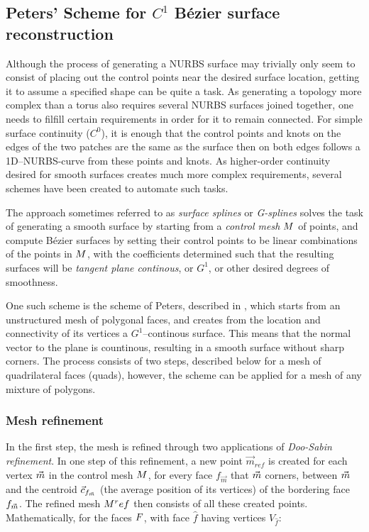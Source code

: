 \subsection{Peters' Scheme for $C^1$ B{\'e}zier surface reconstruction}
Although the process of generating a NURBS surface may trivially only seem to consist of placing out the control points near the desired surface location, getting it to assume a specified shape can be quite a task. As generating a topology more complex than a torus  also requires several NURBS surfaces joined together, one needs to filfill certain requirements in order for it to remain connected. For simple surface continuity ($C^0$), it is enough that the control points and knots on the edges of the two patches are the same as the surface then on both edges follows a 1D--NURBS-curve from these points and knots. As higher-order continuity desired for smooth surfaces creates much more complex requirements, several schemes have been created to automate such tasks.

The approach sometimes referred to as \emph{surface splines} or \emph{G-splines} \cite{eck1996automatic} solves the task of generating a smooth surface by starting from a \emph{control mesh} $\petersControlMesh$ of points, and compute B{\'e}zier surfaces by setting their control points to be linear combinations of the points in $\petersControlMesh$, with the coefficients determined such that the resulting surfaces will be \emph{tangent plane continous}, or $G^1$, or other desired degrees of smoothness. 

One such scheme is the scheme of Peters, described in \cite{peters1992constructing}, which starts from an unstructured mesh of polygonal faces, and creates from the location and connectivity of its vertices a $G^1$--continous surface. This means that the normal vector to the plane is countinous, resulting in a smooth surface without sharp corners. The process consists of two steps, described below for a mesh of quadrilateral faces (quads), however, the scheme can be applied for a mesh of any mixture of polygons.

\subsubsection{Mesh refinement}
In the first step, the mesh is refined through two applications of \emph{Doo-Sabin refinement}. In one step of this refinement, a new point $\vec{m}_{ref}$  is created for each vertex $\petersControlMeshVec$ in the control mesh $\petersControlMesh$, for every face $f_{\vec{m}}$ that $\petersControlMeshVec$ corners,  between $\petersControlMeshVec$ and the centroid $\centroidof{f_{\petersControlMeshVec}}$ (the average position of its vertices) of the bordering face $f_{\petersControlMeshVec}$. The refined mesh $\petersControlMesh^ref$ then consists of all these created points. Mathematically, for the faces $\petersFaces$, with face ${\hat{f}}$ having vertices $V_{\hat{f}}$:

